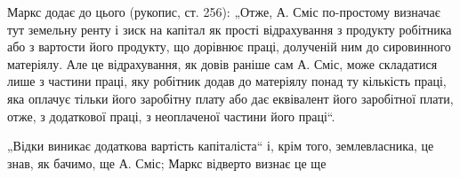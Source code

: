 Маркс додає до цього (рукопис, ст. 256): „Отже, А. Сміс по-простому
визначає тут земельну ренту і зиск на капітал як прості відрахування з
продукту робітника або з вартости його продукту, що дорівнює праці,
долученій ним до сировинного матеріялу. Але це відрахування, як довів
раніше сам А. Сміс, може складатися лише з частини праці, яку робітник
додав до матеріялу понад ту кількість праці, яка оплачує тільки
його заробітну плату або дає еквівалент його заробітної плати, отже, з
додаткової праці, з неоплаченої частини його праці“.

„Відки виникає додаткова вартість капіталіста“ і, крім того, землевласника,
це знав, як бачимо, ще А. Сміс; Маркс відверто визнає це ще
\parbreak{}  %
